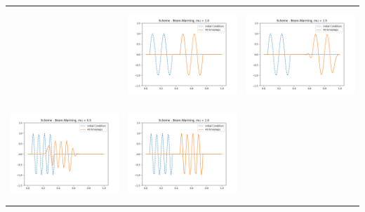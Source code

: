 \documentclass[a4paper,twoside,11pt]{article}
\begin{document}
\begin{table}[!h]
\begin{tabular}{ | c | m{5cm} | m{5cm} | }
\begin{minipage}{.3\textwidth}
            \end{minipage}
            &
            \begin{minipage}{.3\textwidth}
              \includegraphics[width=\linewidth, height=3.5cm]{../plots/scheme5-IC2-mu1_0.png}
            \end{minipage}
            &
            \begin{minipage}{.3\textwidth}
              \includegraphics[width=\linewidth, height=3.5cm]{../plots/scheme5-IC2-mu1_5.png}
            \end{minipage} \\
            \begin{minipage}{.3\textwidth}
              \includegraphics[width=\linewidth, height=3.5cm]{../plots/scheme5-IC3-mu0_5.png}
            \end{minipage}
            &
            \begin{minipage}{.3\textwidth}
              \includegraphics[width=\linewidth, height=3.5cm]{../plots/scheme5-IC3-mu1_0.png}
            \end{minipage}

\end{tabular}
\end{table}
\end{document}
